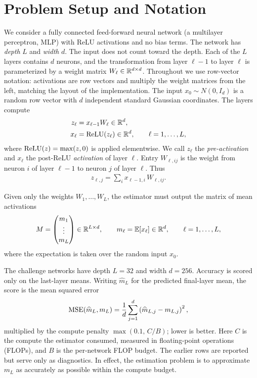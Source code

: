 \section{Problem Setup and Notation}

We consider a fully connected feed-forward neural network (a multilayer perceptron, MLP) with ReLU activations and no bias terms. The network has \emph{depth} $L$ and \emph{width} $d$. The input does not count toward the depth. Each of the $L$ layers contains $d$ neurons, and the transformation from layer $\ell-1$ to layer $\ell$ is parameterized by a weight matrix $W_\ell\in\mathbb{R}^{d\times d}$. Throughout we use row-vector notation: activations are row vectors and multiply the weight matrices from the left, matching the layout of the implementation. The input $x_0\sim N(0,I_d)$ is a random row vector with $d$ independent standard Gaussian coordinates. The layers compute
\begin{align}
    z_\ell &= x_{\ell-1} W_\ell \in \mathbb{R}^d, \\
    x_\ell &= \operatorname{ReLU}(z_\ell) \in \mathbb{R}^d, \qquad \ell=1,\ldots,L,
\end{align}
where $\operatorname{ReLU}(z)=\max(z,0)$ is applied elementwise. We call $z_\ell$ the \emph{pre-activation} and $x_\ell$ the post-ReLU \emph{activation} of layer $\ell$. Entry $W_{\ell,ij}$ is the weight from neuron $i$ of layer $\ell-1$ to neuron $j$ of layer $\ell$. Thus
\begin{align}
    z_{\ell,j} = \sum_i x_{\ell-1,i}\,W_{\ell,ij}.
\end{align}

Given only the weights $W_1,\ldots,W_L$, the estimator must output the matrix of mean activations
\begin{align}
    M = \begin{pmatrix} m_1 \\ \vdots \\ m_L \end{pmatrix} \in \mathbb{R}^{L\times d},
    \qquad m_\ell = \mathbb{E}[x_\ell]\in\mathbb{R}^d,\qquad \ell=1,\ldots,L,
\end{align}
where the expectation is taken over the random input $x_0$.

The challenge networks have depth $L=32$ and width $d=256$. Accuracy is scored only on the last-layer means. Writing $\widehat m_L$ for the predicted final-layer mean, the score is the mean squared error
\begin{align}
    \operatorname{MSE}(\widehat m_L, m_L) = \frac{1}{d}\sum_{j=1}^{d}\left(\widehat m_{L,j} - m_{L,j}\right)^2,
\end{align}
multiplied by the compute penalty $\max(0.1,\, C/B)$; lower is better. Here $C$ is the compute the estimator consumed, measured in floating-point operations (FLOPs), and $B$ is the per-network FLOP budget. The earlier rows are reported but serve only as diagnostics. In effect, the estimation problem is to approximate $m_L$ as accurately as possible within the compute budget.
